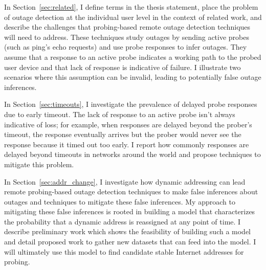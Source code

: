In Section~\ref{sec:related}, I define terms in the thesis statement, place the problem of outage detection
at the individual user level in the context of related work, and describe the challenges
that probing-based remote outage detection techniques will need to address. These
techniques study outages by sending active probes (such as ping's echo
requests) and use probe responses to infer outages. They assume that a
response to an active probe indicates a working path to the probed
user device and that lack of response is indicative of failure. I
illustrate two scenarios where this assumption can be
invalid, leading to potentially false outage inferences.

In Section~\ref{sec:timeouts}, I investigate the prevalence of delayed
probe responses due to early timeout. The
lack of response to an active probe isn't always indicative of loss;
for example, when
responses are delayed beyond the prober's timeout, the response
eventually arrives but the prober would never see the response because
it timed out too early. I report how commonly responses are delayed
beyond timeouts in
networks around the world and propose techniques to mitigate this
problem. 

In Section~\ref{sec:addr_change}, I investigate how dynamic addressing can
lead remote probing-based outage detection techniques to make false inferences about outages and techniques to
mitigate these false inferences. My approach to mitigating
these false inferences is rooted in building a model that characterizes
the probability that a dynamic address is reassigned at any point of time. I describe preliminary
work which shows the feasibility of building such a model and detail
proposed work to gather new datasets that can feed into the
model. I will ultimately use this model to find candidate stable Internet
addresses for probing.

